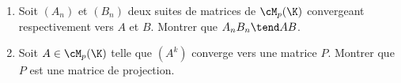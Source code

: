 
\begin{enumerate}
\item Soit $(A_n)$ et $(B_n)$ deux suites de matrices de $\cM_p(\K)$ convergeant respectivement vers $A$ et $B$. Montrer que $A_nB_n\tend AB$.
\item Soit $A \in \cM_p(\K)$ telle que $(A^k)$ converge vers une matrice $P$. Montrer que $P$ est une matrice de projection.
\end{enumerate}
